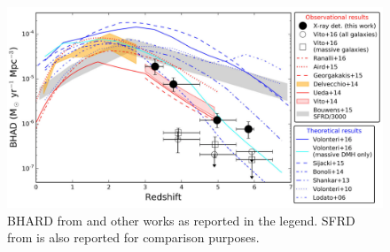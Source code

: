 \begin{figure}
\begin{center}
  \includegraphics[width=\textwidth]{Figs/Intro/BHARD_Vito18.pdf}
  \vspace{-30pt}
  \caption{BHARD from \citet{2018MNRAS.473.2378V} and other works as reported in the legend. SFRD from \citet{2015ApJ...803...34B} is also reported for comparison purposes.}
    \label{fig:BHARD}
\end{center}
\end{figure}

